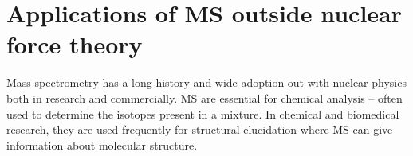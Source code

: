 \section{Applications of MS outside nuclear force theory}

Mass spectrometry has a long history and wide adoption out with nuclear physics both in research and commercially.
MS are essential for chemical analysis – often used to determine the isotopes present in a mixture.
In chemical and biomedical research, they are used frequently for structural elucidation where MS can give information about molecular structure. \cite{bhattarai_chapter_2020}